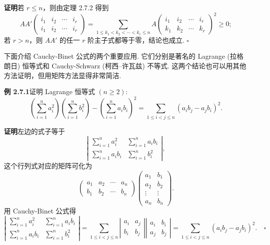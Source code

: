 \documentclass[UTF8,12pt,a4paper,fontset=fandol]{ctexart}
\begin{document}
\noindent\textbf{证明}\quad 若 $r\leq n$，则由定理 2.7.2 得到
\[
AA'\left(\begin{array}{cccc}
i_1 & i_2 & \cdots & i_r\\
i_1 & i_2 & \cdots & i_r
\end{array}\right)=
\sum_{1\leq k_1<k_2<\cdots<k_r\leq n}
A\left(\begin{array}{cccc}
i_1 & i_2 & \cdots & i_r\\
k_1 & k_2 & \cdots & k_r
\end{array}\right)^2\geq 0;
\]
若 $r>n$，则 $AA'$ 的任一 $r$ 阶主子式都等于零，结论也成立. $\square$

下面介绍 Cauchy-Binet 公式的两个重要应用. 它们分别是著名的 Lagrange (拉格朗日) 恒等式和 Cauchy-Schwarz (柯西--许瓦兹) 不等式. 这两个结论也可以用其他方法证明，但用矩阵方法显得非常简洁.

\noindent\textbf{例 2.7.1}\quad 证明 Lagrange 恒等式 $(n\geq 2)$:
\[
\left(\sum_{i=1}^n a_i^2\right)\left(\sum_{i=1}^n b_i^2\right)-\left(\sum_{i=1}^n a_ib_i\right)^2
=\sum_{1\leq i<j\leq n}(a_ib_j-a_jb_i)^2.
\]

\noindent\textbf{证明}\quad 左边的式子等于
\[
\left|\begin{array}{cc}
\sum\limits_{i=1}^n a_i^2 & \sum\limits_{i=1}^n a_ib_i\\
\sum\limits_{i=1}^n a_ib_i & \sum\limits_{i=1}^n b_i^2
\end{array}\right|,
\]
这个行列式对应的矩阵可化为
\[
\left(\begin{array}{cccc}
a_1 & a_2 & \cdots & a_n\\
b_1 & b_2 & \cdots & b_n
\end{array}\right)
\left(\begin{array}{cc}
a_1 & b_1\\
a_2 & b_2\\
\vdots & \vdots\\
a_n & b_n
\end{array}\right).
\]
用 Cauchy-Binet 公式得
\[
\left|\begin{array}{cc}
\sum\limits_{i=1}^n a_i^2 & \sum\limits_{i=1}^n a_ib_i\\
\sum\limits_{i=1}^n a_ib_i & \sum\limits_{i=1}^n b_i^2
\end{array}\right|
=\sum_{1\leq i<j\leq n}
\left|\begin{array}{cc}
a_i & a_j\\
b_i & b_j
\end{array}\right|
\left|\begin{array}{cc}
a_i & b_i\\
a_j & b_j
\end{array}\right|
=\sum_{1\leq i<j\leq n}(a_ib_j-a_jb_i)^2. \quad \square
\]
\end{document}
